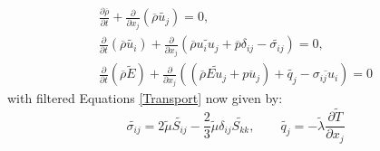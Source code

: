 \begin{equation} \label{NSE_favre_filtered}
\begin{split}
  \frac{\partial\overline{\rho}}{\partial t} + \frac{\partial }{\partial x_j} \left( \overline{\rho}\widetilde{ u_j} \right) = 0,  \\
  \frac{\partial}{\partial t} \left( \overline{\rho}\widetilde{ u_i }\right) + \frac{\partial}{\partial x_j} \left(\overline{\rho}\widetilde{ u_i u_j} + \overline{p }\delta_{ij} - \widetilde{\sigma_{ij}} \right) = 0,  \\
  \frac{\partial}{\partial t} \left( \overline{\rho}\widetilde{ E} \right) + \frac{\partial}{\partial x_j} \left(\left( \overline{\rho}\widetilde{ Eu_j}+\overline{p u_j} \right) + \widetilde{q_j} - \overline{\sigma_{ij} u_i}\right) = 0 
\end{split}
\end{equation}
with filtered Equations \ref{Transport} now given by: 
\begin{equation} \label{filtered_trans}
  \widetilde{\sigma_{ij}} = 2\widetilde{\mu}\widetilde{ S_{ij}} - \frac{2}{3}\widetilde{\mu} \delta_{ij} \widetilde{ S_{kk}}, \quad \quad
  \widetilde{q_j} = -\widetilde{\lambda} \frac{\partial \widetilde{T}}{\partial x_j}
\end{equation}

